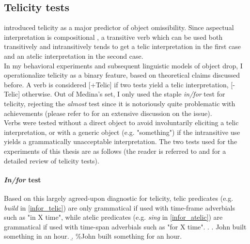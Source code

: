 \subsection{Telicity tests} 
 introduced telicity as a major predictor of object omissibility. Since aspectual interpretation is compositional \parencite[14]{Olsen1997}, a transitive verb which can be used both transitively and intransitively tends to get a telic interpretation in the first case and an atelic interpretation in the second case.\\ 
In my behavioral experiments and subsequent linguistic models of object drop, I operationalize telicity as a binary feature, based on theoretical claims discussed before. A verb is considered [+Telic] if two tests yield a telic interpretation, [-Telic] otherwise. Out of Medina's set, I only used the staple \textit{in/for} test for telicity, rejecting the \textit{almost} test since it is notoriously quite problematic with achievements (please refer to \textcite{bertinetto-delfitto2000aspect} for an extensive discussion on the issue).\\
Verbs were tested without a direct object to avoid involuntarily eliciting a telic interpretation, or with a generic object (e.g. "something") if the intransitive use yields a grammatically unacceptable interpretation. The two tests used for the experiments of this thesis are as follows (the reader is referred to \textcite{Borik2006} and \textcite{Liu2014} for a detailed review of telicity tests).

\paragraph{\textit{In/for} test} Based on this largely agreed-upon diagnostic for telicity, telic predicates (e.g. \textit{build} in \ref{infor_telic}) are only grammatical if used with time-frame adverbials such as "in X time", while atelic predicates (e.g. \textit{sing} in \ref{infor_atelic}) are grammatical if used with time-span adverbials such as "for X time".
\ex. \label{infor_telic} \a. John built something in an hour.
\b. \%John built something for an hour.

